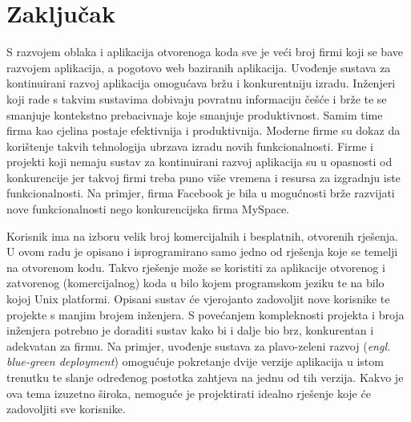 \chapter{Zaključak}
S razvojem oblaka i aplikacija otvorenoga koda sve je veći broj firmi koji se bave razvojem
aplikacija, a pogotovo web baziranih aplikacija. Uvođenje sustava za kontinuirani razvoj aplikacija
omogućava bržu i konkurentniju izradu. Inženjeri koji rade s takvim sustavima dobivaju povratnu
informaciju češće i brže te se smanjuje kontekstno prebacivnaje koje smanjuje produktivnost. Samim
time firma kao cjelina postaje efektivnija i produktivnija. Moderne firme su dokaz da korištenje
takvih tehnologija ubrzava izradu novih funkcionalnosti. Firme i projekti koji nemaju sustav za
kontinuirani razvoj aplikacija su u opasnosti od konkurencije jer takvoj firmi treba puno više
vremena i resursa za izgradnju iste funkcionalnosti. Na primjer, firma Facebook je bila u
mogućnosti brže razvijati nove funkcionalnosti nego konkurencijska firma MySpace.

Korisnik ima na izboru velik broj komercijalnih i besplatnih, otvorenih rješenja. U ovom radu je
opisano i isprogramirano samo jedno od rješenja koje se temelji na otvorenom kodu. Takvo rješenje
može se koristiti za aplikacije otvorenog i zatvorenog (komercijalnog) koda u bilo kojem programskom
jeziku te na bilo kojoj Unix platformi. Opisani sustav će vjerojanto zadovoljit nove korisnike te
projekte s manjim brojem inženjera. S povećanjem kompleknosti projekta i broja inženjera potrebno je
doraditi sustav kako bi i dalje bio brz, konkurentan i adekvatan za firmu. Na primjer, uvođenje
sustava za plavo-zeleni razvoj (\textit{engl. blue-green deployment}) omogućuje pokretanje dvije
verzije aplikacija u istom trenutku te slanje određenog postotka zahtjeva na jednu od tih verzija.
Kakvo je ova tema izuzetno široka, nemoguće je projektirati idealno rješenje koje će zadovoljiti sve
korisnike.

